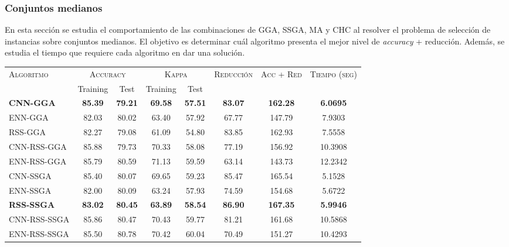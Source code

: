 \subsubsection{Conjuntos medianos}

En esta sección se estudia el comportamiento de las combinaciones de GGA, SSGA, MA y CHC al resolver el problema de selección de instancias sobre conjuntos medianos. El objetivo es determinar cuál algoritmo presenta el mejor nivel de \emph{accuracy} + reducción. Además, se estudia el tiempo que requiere cada algoritmo en dar una solución.

\begin{table}[h!]
\centering
\begin{adjustbox}{max width =\textwidth}
\begin{tabular}{l c c c c c c c}
\hline
\multirow{2}{*}{\textsc{Algoritmo}}
	& \multicolumn{2}{c}{\textsc{Accuracy}}
	& \multicolumn{2}{c}{\textsc{Kappa}}
	& \textsc{Reducción}
	& \textsc{Acc + Red}
	& \textsc{Tiempo (seg)} \\
	& Training & Test
	& Training & Test \\ 
\hline
\hline

\textbf{CNN-GGA}      & \textbf{85.39} & \textbf{79.21} & \textbf{69.58} & \textbf{57.51} & \textbf{83.07} & \textbf{162.28} & \textbf{6.0695} \\
ENN-GGA      & 82.03 & 80.02 & 63.40 & 57.92 & 67.77 & 147.79 & 7.9303 \\
RSS-GGA      & 82.27 & 79.08 & 61.09 & 54.80 & 83.85 & 162.93 & 7.5558 \\
CNN-RSS-GGA  & 85.88 & 79.73 & 70.33 & 58.08 & 77.19 & 156.92 & 10.3908 \\
ENN-RSS-GGA  & 85.79 & 80.59 & 71.13 & 59.59 & 63.14 & 143.73 & 12.2342 \\

\hline

CNN-SSGA & 85.40 & 80.07 & 69.65 & 59.23 & 85.47 & 165.54 & 5.1528 \\
ENN-SSGA & 82.00 & 80.09 & 63.24 & 57.93 & 74.59 & 154.68 & 5.6722 \\
\textbf{RSS-SSGA} & \textbf{83.02} & \textbf{80.45} & \textbf{63.89} & \textbf{58.54} & \textbf{86.90} & \textbf{167.35} & \textbf{5.9946} \\
CNN-RSS-SSGA & 85.86 & 80.47 & 70.43 & 59.77 & 81.21 & 161.68 & 10.5868 \\
ENN-RSS-SSGA & 85.50 & 80.78 & 70.42 & 60.04 & 70.49 & 151.27 & 10.4293 \\


\end{tabular}
\end{adjustbox}
\end{table}
